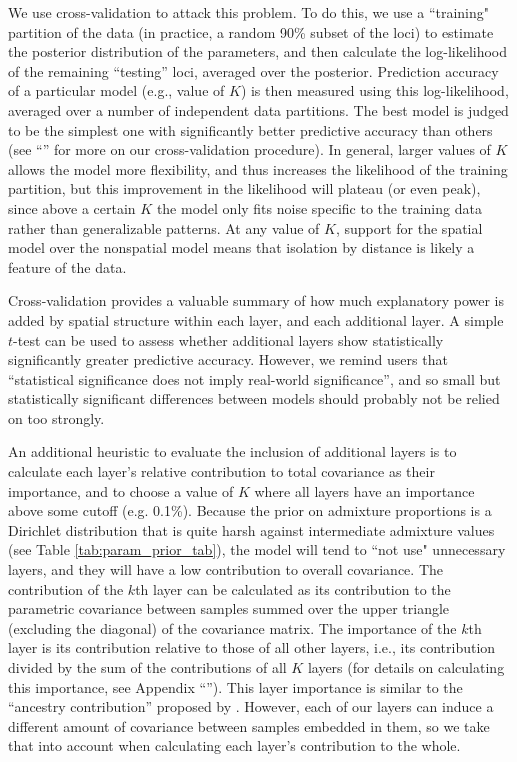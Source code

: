 \documentclass[12pt]{article}
\newcommand{\secref}[1]{``\nameref{#1}''}
\begin{document}
We use cross-validation \citep[similar in spirit to][]{ADMIXTURE_xval} to attack this problem.
To do this,
we use a ``training" partition of the data (in practice, a random 90\% subset of the loci)
to estimate the posterior distribution of the parameters,
and then calculate the log-likelihood of the remaining ``testing'' loci,
averaged over the posterior.
Prediction accuracy of a particular model (e.g., value of $K$)
is then measured using this log-likelihood,
averaged over a number of independent data partitions.
The best model is judged to be the simplest one with significantly better predictive accuracy
than others (see \secref{Xvalidation} for more on our cross-validation procedure).
In general, larger values of $K$ allows the model more flexibility,
and thus increases the likelihood of the training partition, 
but this improvement in the likelihood will plateau (or even peak), 
since above a certain $K$ the model only fits noise specific to the training data 
rather than generalizable patterns.
At any value of $K$, support for the spatial model over the nonspatial model 
means that isolation by distance is likely a feature of the data.

Cross-validation provides a valuable summary of how much explanatory power
is added by spatial structure within each layer, and each additional layer.
A simple $t$-test can be used to assess whether additional layers
show statistically significantly greater predictive accuracy.
However, we remind users that ``statistical significance does not imply real-world significance'',
and so small but statistically significant differences between models
should probably not be relied on too strongly.

An additional heuristic to evaluate the inclusion of additional layers is to calculate 
each layer's relative contribution to total covariance as their importance, 
and to choose a value of $K$ where all layers have an importance above some cutoff (e.g. 0.1\%).
Because the prior on admixture proportions is a Dirichlet distribution 
that is quite harsh against intermediate admixture values (see Table \ref{tab:param_prior_tab}),  
the model will tend to ``not use" unnecessary layers, 
and they will have a low contribution to overall covariance.
The contribution of the $k$th layer can be calculated as
its contribution to the parametric covariance between samples 
summed over the upper triangle (excluding the diagonal) of the covariance matrix.
The importance of the $k$th layer is its contribution relative to those of all other layers, 
i.e., its contribution divided by the sum of the contributions of all $K$ layers
(for details on calculating this importance, see Appendix \secref{layer_importance}). 
This layer importance is similar to the ``ancestry contribution'' proposed by \cite{fastStructure}. 
However, each of our layers can induce a different amount of covariance between samples embedded in them, 
so we take that into account when calculating each layer's contribution to the whole.
\end{document}
